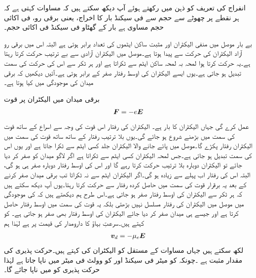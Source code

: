 انفراج کی تعریف کو ذہن میں رکھتے ہوئے آپ دیکھ سکتے ہیں کہ مساوات  کہتی ہے کہ ہر نقطے پر چھوٹے سے حجم سے فی سیکنڈ بار کا اخراج، یعنی برقی رو، فی اکائی حجم مساوی ہے بار کے گھٹاو فی سیکنڈ فی اکائی حجم۔ 


بے  بار موصل میں منفی الیکٹران اور مثبت ساکن ایٹموں کی تعداد برابر ہوتی ہے البتہ اس میں برقی رو آزاد الیکٹران کی حرکت سے پیدا ہوتا ہے۔موصل میں الیکٹران آزادی سے بے ترتیب حرکت کرتا رہتا ہے۔یہ حرکت کرتا ہوا لمحہ بہ لمحہ ساکن ایٹم سے ٹکراتا ہے اور ہر ٹکر سے اس کی حرکت کی سمت تبدیل ہو جاتی ہے۔یوں ایسے الیکٹران کی اوسط رفتار صفر کے برابر ہوتی ہے۔آئیں دیکھیں کہ برقی میدان کی موجودگی میں کیا ہوتا ہے۔

برقی میدان  میں الیکٹران پر قوت
\begin{align}
{\ensuremath{{\boldsymbol{F}}}}=-e{{\boldsymbol{E}}}
\end{align}
عمل کرے گی جہاں الیکٹران کا بار  ہے۔ الیکٹران کی رفتار اس قوت کی وجہ سے  اسراع کے ساتھ قوت کی سمت میں بڑھنے شروع ہو جائے گی۔یوں بلا ترتیب رفتار  کے ساتھ ساتھ قوت کی سمت میں الیکٹران رفتار پکڑے گا۔موصل میں پائے جانے والا الیکٹران جلد کسی ایٹم سے ٹکرا جاتا ہے اور یوں اس کی سمت تبدیل ہو جاتی ہے۔جس لمحہ  الیکٹران کسی ایٹم سے ٹکراتا ہے اگر لاگو میدان کو صفر کر دیا جائے تو الیکٹران دوبارہ بلا ترتیب حرکت کرتا رہے گا اور اس کی اوسط رفتار دوبارہ صفر ہی ہو گی،  البتہ اس کی رفتار اب پہلے سے زیادہ ہو گی۔اگر الیکٹران ایٹم سے نہ ٹکراتا تب برقی میدان صفر کرنے کے بعد یہ برقرار قوت کی سمت میں حاصل کردہ رفتار سے حرکت کرتا رہتا۔یوں آپ دیکھ سکتے ہیں کہ ہر ٹکر سے الیکٹران کی اوسط رفتار صفر ہو جاتی ہے۔اس طرح ہم دیکھتے ہیں کہ   کی موجودگی میں موصل میں الیکٹران کی رفتار مسلسل نہیں بڑھتی بلکہ یہ قوت کی سمت میں اوسط رفتار  حاصل کرتا ہے اور جیسے ہی میدان صفر کر دیا جائے الیکٹران کی اوسط رفتار بھی صفر ہو جاتی ہے۔ کو  کہتے ہیں۔سرعتِ بہاؤ کا دارومدار  کی قیمت پر ہے لہٰذا ہم
\begin{align}\label{مساوات_کپیسٹر_رفتار_بہاو}
{\ensuremath{{\boldsymbol{v}}}}_d=-\mu_e {{\boldsymbol{E}}}
\end{align}
لکھ سکتے ہیں جہاں مساوات کے مستقل  کو الیکٹران کی  کہتے ہیں۔حرکت پذیری کی مقدار مثبت ہے ۔چونکہ  کو میٹر فی سیکنڈ اور  کو وولٹ فی میٹر میں ناپا جاتا ہے لہٰذا حرکت پذیری کو  میں ناپا جائے گا۔


